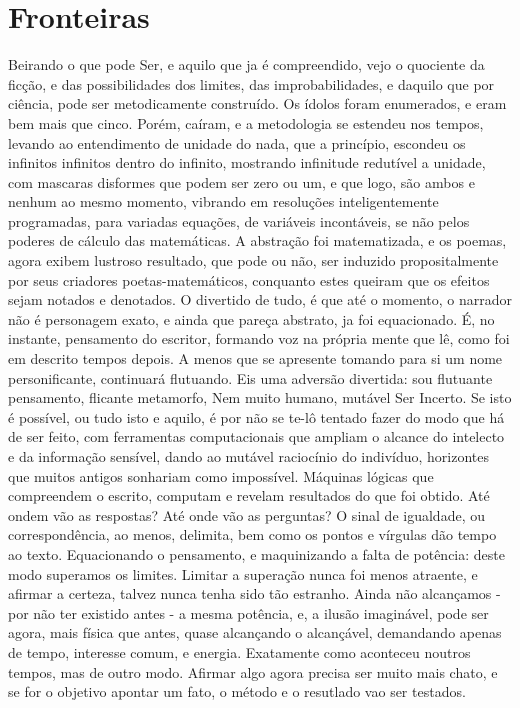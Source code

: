 \documentclass[a4paper,11pt]{book}
\begin{document}
\section{Fronteiras}
	Beirando o que pode Ser, e aquilo que ja é compreendido, vejo o quociente da ficção, e das possibilidades dos limites, das improbabilidades, e daquilo que por ciência, pode ser metodicamente construído.
	Os ídolos foram enumerados, e eram bem mais que cinco. Porém, caíram, e a metodologia se estendeu nos tempos, levando ao entendimento de unidade do nada, que a princípio, escondeu os infinitos infinitos dentro do infinito, mostrando infinitude redutível a unidade, com mascaras disformes que podem ser zero ou um, e que logo, são ambos e nenhum ao mesmo momento, vibrando em resoluções inteligentemente programadas, para variadas equações, de variáveis incontáveis, se não pelos poderes de cálculo das matemáticas.
	A abstração foi matematizada, e os poemas, agora exibem lustroso resultado, que pode ou não, ser induzido propositalmente por seus criadores poetas-matemáticos, conquanto estes queiram que os efeitos sejam notados e denotados.
	O divertido de tudo, é que até o momento, o narrador não é personagem exato, e ainda que pareça abstrato, ja foi equacionado. É, no instante, pensamento do escritor, formando voz na própria mente que lê, como foi em descrito tempos depois. A menos que se apresente tomando para si um nome personificante, continuará flutuando. Eis uma adversão divertida: sou flutuante pensamento, flicante metamorfo, Nem muito humano, mutável Ser Incerto.
	Se isto é possível, ou tudo isto e aquilo, é por não se te-lô tentado fazer do modo que há de ser feito, com ferramentas computacionais que ampliam o alcance do intelecto e da informação sensível, dando ao mutável raciocínio do indivíduo, horizontes que muitos antigos sonhariam como impossível.
	Máquinas lógicas que compreendem o escrito, computam e revelam resultados do que foi obtido. Até ondem vão as respostas? Até onde vão as perguntas? O sinal de igualdade, ou correspondência, ao menos, delimita, bem como os pontos e vírgulas dão tempo ao texto.
	Equacionando o pensamento, e maquinizando a falta de potência: deste modo superamos os limites. Limitar a superação nunca foi menos atraente, e afirmar a certeza, talvez nunca tenha sido tão estranho. Ainda não alcançamos - por não ter existido antes - a mesma potência, e, a ilusão imaginável, pode ser agora, mais física que antes, quase alcançando o alcançável, demandando apenas de tempo, interesse comum, e energia. Exatamente como aconteceu noutros tempos, mas de outro modo. Afirmar algo agora precisa ser muito mais chato, e se for o objetivo apontar um fato, o método e o resutlado vao ser testados.
	\linebreak
\end{document}
